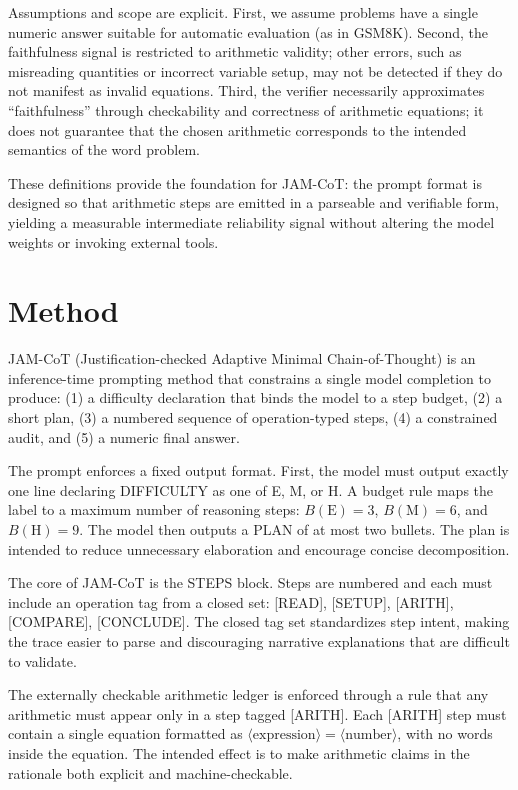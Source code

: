 \documentclass[journal,article,submit,pdftex,moreauthors]{Definitions/mdpi}
\begin{document}
Assumptions and scope are explicit. First, we assume problems have a single numeric answer suitable for automatic evaluation (as in GSM8K). Second, the faithfulness signal is restricted to arithmetic validity; other errors, such as misreading quantities or incorrect variable setup, may not be detected if they do not manifest as invalid equations. Third, the verifier necessarily approximates ``faithfulness'' through checkability and correctness of arithmetic equations; it does not guarantee that the chosen arithmetic corresponds to the intended semantics of the word problem.

These definitions provide the foundation for JAM-CoT: the prompt format is designed so that arithmetic steps are emitted in a parseable and verifiable form, yielding a measurable intermediate reliability signal without altering the model weights or invoking external tools.

\section{Method}

JAM-CoT (Justification-checked Adaptive Minimal Chain-of-Thought) is an inference-time prompting method that constrains a single model completion to produce: (1) a difficulty declaration that binds the model to a step budget, (2) a short plan, (3) a numbered sequence of operation-typed steps, (4) a constrained audit, and (5) a numeric final answer.

The prompt enforces a fixed output format. First, the model must output exactly one line declaring DIFFICULTY as one of E, M, or H. A budget rule maps the label to a maximum number of reasoning steps: $B(\mathrm{E})=3$, $B(\mathrm{M})=6$, and $B(\mathrm{H})=9$. The model then outputs a PLAN of at most two bullets. The plan is intended to reduce unnecessary elaboration and encourage concise decomposition.

The core of JAM-CoT is the STEPS block. Steps are numbered and each must include an operation tag from a closed set: [READ], [SETUP], [ARITH], [COMPARE], [CONCLUDE]. The closed tag set standardizes step intent, making the trace easier to parse and discouraging narrative explanations that are difficult to validate.

The externally checkable arithmetic ledger is enforced through a rule that any arithmetic must appear only in a step tagged [ARITH]. Each [ARITH] step must contain a single equation formatted as $\langle\text{expression}\rangle = \langle\text{number}\rangle$, with no words inside the equation. The intended effect is to make arithmetic claims in the rationale both explicit and machine-checkable.
\end{document}
